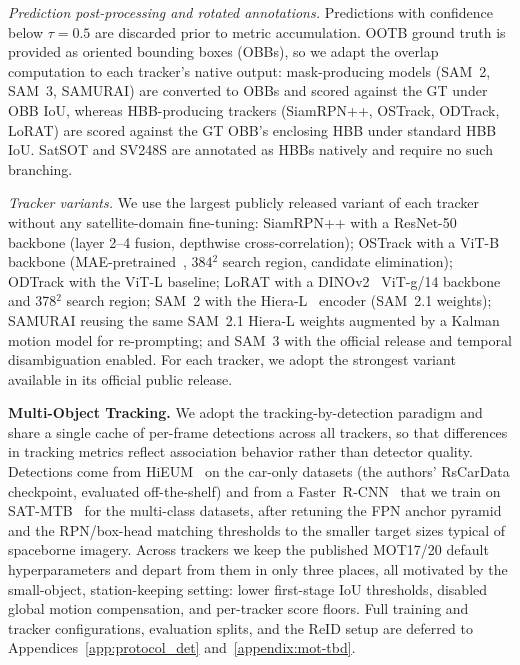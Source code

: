 \documentclass{article}
\newcommand{\subhead}[1]{\noindent\textbf{#1.}}
\newcommand{\minihead}[1]{\noindent\textit{#1.}}
\begin{document}
\minihead{Prediction post-processing and rotated annotations}
Predictions with confidence below $\tau{=}0.5$ are discarded prior to metric
accumulation. OOTB ground truth is provided as oriented bounding boxes (OBBs),
so we adapt the overlap computation to each tracker's native output:
mask-producing models (SAM~2, SAM~3, SAMURAI) are converted to OBBs and scored
against the GT under OBB IoU, whereas HBB-producing trackers (SiamRPN++,
OSTrack, ODTrack, LoRAT) are scored against the GT OBB's enclosing HBB under
standard HBB IoU. SatSOT and SV248S are annotated as HBBs natively and require
no such branching.

\minihead{Tracker variants} We use the largest publicly released variant
of each tracker without any satellite-domain fine-tuning: SiamRPN++ with a
ResNet-50~\citep{he2016resnet} backbone (layer 2--4 fusion, depthwise
cross-correlation); OSTrack with a ViT-B~\citep{dosovitskiy2021vit}
backbone (MAE-pretrained~\citep{he2022mae}, 384$^2$ search region,
candidate elimination); ODTrack with the ViT-L baseline; LoRAT with a
DINOv2~\citep{oquab2024dinov2} ViT-g/14 backbone and 378$^2$ search
region; SAM~2 with the Hiera-L~\citep{ryali2023hiera} encoder (SAM~2.1
weights); SAMURAI reusing the same SAM~2.1 Hiera-L weights augmented by a
Kalman motion model for re-prompting; and SAM~3 with the official release
and temporal disambiguation enabled. For each tracker, we adopt the
strongest variant available in its official public release.



\subhead{Multi-Object Tracking}
We adopt the tracking-by-detection paradigm and share a single cache
of per-frame detections across all trackers, so that differences in
tracking metrics reflect association behavior rather than detector
quality. Detections come from HiEUM~\citep{Xiao2024HiEUM} on the
car-only datasets (the authors' RsCarData checkpoint, evaluated
off-the-shelf) and from a Faster~R-CNN~\citep{ren2015fasterrcnn} that
we train on SAT-MTB~\citep{Li2023SATMTB} for the multi-class datasets,
after retuning the FPN anchor pyramid and the RPN/box-head matching
thresholds to the smaller target sizes typical of spaceborne imagery.
Across trackers we keep the published MOT17/20 default hyperparameters
and depart from them in only three places, all motivated by the
small-object, station-keeping setting: lower first-stage IoU
thresholds, disabled global motion compensation, and per-tracker
score floors. Full training and tracker configurations, evaluation
splits, and the ReID setup are deferred to
Appendices~\ref{app:protocol_det} and~\ref{appendix:mot-tbd}.
\end{document}

